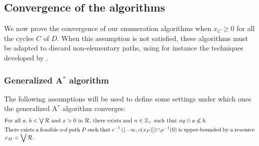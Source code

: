 \documentclass[11pt]{amsart}
\theoremstyle{plain}
\theoremstyle{remark}
\def\Z{\mathbb{Z}}
\newcommand{\rplus}{\oplus}
\newcommand{\rgeq}{\geqslant}
\newcommand{\nrleq}{\nleqslant}
\newcommand{\rset}{\mathcal{R}}
\newcommand{\re}{x}
\begin{document}
\subsection{Convergence of the algorithms} \label{sub:convergence_of_the_algorithms}



We now prove the convergence of our enumeration algorithms when $x_{C} \rgeq 0$ for all the cycles $C$ of $D$. When this assumption is not satisfied, these algorithms must be adapted to discard non-elementary paths, using for instance the techniques developed by \citet{feillet2004exact}. 

\subsubsection{Generalized A$^{*}$ algorithm} \label{ssub:generalized_Astar}
The following assumptions will be used to define some settings under which ones the generalized A$^{*}$ algorithm converges:
\begin{align}
&\parbox{15.5cm}{For all $a$, $b < \bigjoin \rset$ and $\re > 0$ in $\rset$, there exists and $n \in \Z_{+}$ such that $nq\rplus a \nrleq b$.}\label{eq:weakArchimedeanProperty} \\
& \parbox{15.5cm}{There exists a feasible $o$-$d$ path $P$ such that $\displaystyle c^{-1}\left((-\infty,c(\re_{P})]\right) \cap \rho^{-1}(0)$ is upper-bounded by a resource $\displaystyle\re_{M} < \bigjoin\rset$.} \label{eq:costUpperBoundedCondition}
\end{align}
\end{document}
